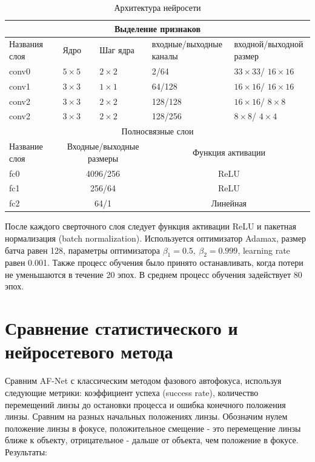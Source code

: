 \begin{table}[!htbp]
	\centering
	\small
	\begin{tabular}{|p{2.5cm}<{\centering}|p{2.5cm}<{\centering}|p{2.5cm}<{\centering}|p{3.5cm}<{\centering}|p{3.5cm}<{\centering}|}
		\hline
		\multicolumn{5}{|c|}{Выделение признаков} \\ \hline
		Названия слоя & Ядро & Шаг ядра & входные/выходные каналы & входной/выходной размер\\ \hline
		conv0 & $5 \times 5$ & $2 \times 2$ & 2/64 & $33 \times 33$/ $16 \times 16$ \\ \hline
		conv1 & $3 \times 3$ & $1 \times 1$ & 64/128 & $16 \times 16$/ $16 \times 16$ \\ \hline
		conv2 & $3 \times 3$ & $2 \times 2$ & 128/128 & $16 \times 16$/ $8 \times 8$ \\ \hline
		conv2 & $3 \times 3$ & $2 \times 2$ & 128/256 & $8 \times 8$/ $4 \times 4$ \\ \hline
		\multicolumn{5}{|c|}{Полносвязные слои} \\ \hline
		Название слоя & \multicolumn{2}{c|}{Входные/выходные размеры} & \multicolumn{2}{c|}{Функция активации} \\ \hline
		fc0 & \multicolumn{2}{c|}{4096/256} & \multicolumn{2}{c|}{ReLU} \\ \hline
		fc1 & \multicolumn{2}{c|}{256/64} & \multicolumn{2}{c|}{ReLU} \\ \hline
		fc2 & \multicolumn{2}{c|}{64/1} & \multicolumn{2}{c|}{Линейная} \\ \hline
	\end{tabular}
	\caption{Архитектура нейросети}
	\label{tab:CNN_struct}
\end{table}

После каждого сверточного слоя следует функция активации ReLU и пакетная нормализация (batch normalization). Используется оптимизатор Adamax, размер батча равен 128, параметры оптимизатора $\beta_1 = 0.5,\ \beta_2 = 0.999$, learning rate равен 0.001. Также процесс обучения было принято останавливать, когда потери не уменьшаются в течение 20 эпох. В среднем процесс обучения задействует 80 эпох.

\section{Сравнение статистического и нейросетевого метода}
Сравним AF-Net с классическим методом фазового автофокуса, используя следующие метрики: коэффициент успеха (success rate), количество перемещений линзы до остановки процесса и ошибка конечного положения линзы. Сравним на разных начальных положениях линзы. Обозначим нулем положение линзы в фокусе, положительное смещение - это перемещение линзы ближе к объекту, отрицательное - дальше от объекта, чем положение в фокусе. Результаты:

